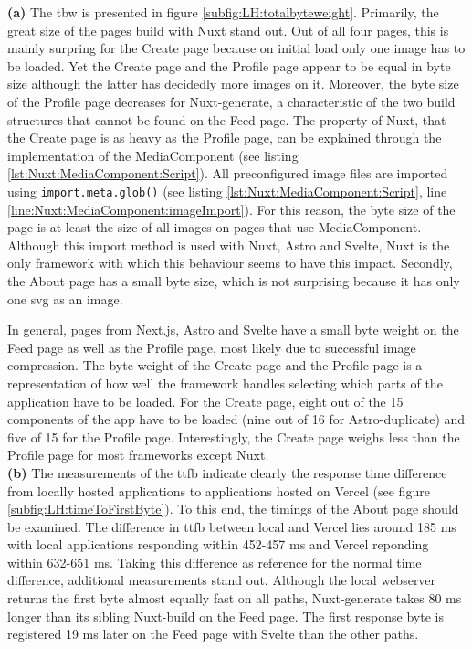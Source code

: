 \documentclass[a4paper, 12pt]{article}
\begin{document}
\textbf{(a)} The \acrlong{tbw} is presented in figure \ref{subfig:LH:totalbyteweight}.
Primarily, the great size of the pages build with Nuxt stand out.
Out of all four pages, this is mainly surpring for the Create page because on initial load only one image has to be loaded.
Yet the Create page and the Profile page appear to be equal in byte size although the latter has decidedly more images on it.
Moreover, the byte size of the Profile page decreases for Nuxt-generate, a characteristic of the two build structures that cannot be found on the Feed page.
The property of Nuxt, that the Create page is as heavy as the Profile page, can be explained through the implementation of the MediaComponent (see listing \ref{lst:Nuxt:MediaComponent:Script}).
All preconfigured image files are imported using \lstinline{import.meta.glob()} (see listing \ref{lst:Nuxt:MediaComponent:Script}, line \ref{line:Nuxt:MediaComponent:imageImport}).
For this reason, the byte size of the page is at least the size of all images on pages that use MediaComponent.
Although this import method is used with Nuxt, Astro and Svelte, Nuxt is the only framework with which this behaviour seems to have this impact.
Secondly, the About page has a small byte size, which is not surprising because it has only one \acrshort{svg} as an image.

In general, pages from Next.js, Astro and Svelte have a small byte weight on the Feed page as well as the Profile page, most likely due to successful image compression.
The byte weight of the Create page and the Profile page is a representation of how well the framework handles selecting which parts of the application have to be loaded.
For the Create page, eight out of the 15 components of the app have to be loaded (nine out of 16 for Astro-duplicate) and five of 15 for the Profile page.
Interestingly, the Create page weighs less than the Profile page for most frameworks except Nuxt.
\\

\textbf{(b)} The measurements of the \acrlong{ttfb} indicate clearly the response time difference from locally hosted applications to applications hosted on Vercel (see figure \ref{subfig:LH:timeToFirstByte}).
To this end, the timings of the About page should be examined.
The difference in \acrshort{ttfb} between local and Vercel lies around 185 ms with local applications responding within 452-457 ms and Vercel reponding within 632-651 ms.
Taking this difference as reference for the normal time difference, additional measurements stand out.
Although the local webserver returns the first byte almost equally fast on all paths, Nuxt-generate takes 80 ms longer than its sibling Nuxt-build on the Feed page.
The first response byte is registered 19 ms later on the Feed page with Svelte than the other paths.
\end{document}
